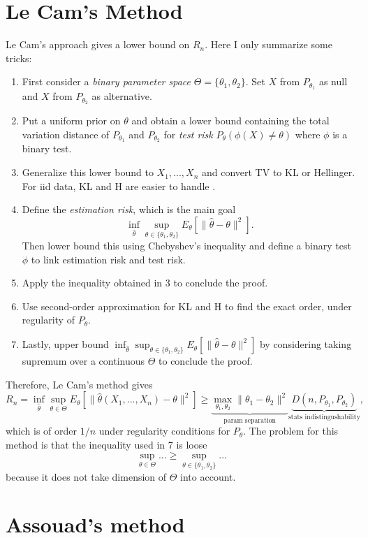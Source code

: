 \documentclass[11pt,twoside]{article}
\begin{document}
\section{Le Cam's Method}
Le Cam's approach gives a lower bound on $R_n$. Here I only summarize some tricks:
\begin{enumerate}
    \item First consider a \textit{binary parameter space} $\Theta = \{\theta_1, \theta_2\}$. Set $X$ from $P_{\theta_1}$ as null and $X$ from $P_{\theta_2}$ as alternative.
    \item Put a uniform prior on $\theta$ and obtain a lower bound containing the total variation distance of $P_{\theta_1}$ and $P_{\theta_2}$ for \textit{test risk} $P_{\theta}(\phi(X) \neq \theta)$ where $\phi$ is a binary test.
    \item Generalize this lower bound to $X_1,...,X_n$ and convert TV to KL or Hellinger. For iid data, KL and H are easier to handle .
    \item Define the \textit{estimation risk}, which is the main goal
    \[
    \inf_{\hat{\theta}}\sup_{\theta \in \{\theta_1, \theta_2\}}E_{\theta}[\|\hat{\theta}-\theta\|^2].
    \]
    Then lower bound this using Chebyshev's inequality and define a binary test $\phi$ to link estimation risk and test risk.
    \item Apply the inequality obtained in 3 to conclude the proof.
    \item Use second-order approximation for KL and H to find the exact order, under regularity of $P_{\theta}$.
    \item Lastly, upper bound $\inf_{\hat{\theta}}\sup_{\theta \in \{\theta_1, \theta_2\}}E_{\theta}[\|\hat{\theta}-\theta\|^2]$ by considering taking supremum over a continuous $\Theta$ to conclude the proof. 
\end{enumerate}
Therefore, Le Cam's method gives
\[
R_n = \inf_{\hat{\theta}}\sup_{\theta \in \Theta} E_{\theta}[\|\hat{\theta}(X_1,...,X_n)-\theta \|^2] \geq \underbrace{\max_{\theta_1,\theta_2}\|\theta_1-\theta_2\|^2}_{\text{param separation}} \underbrace{D(n, P_{\theta_1}, P_{\theta_2})}_{\text{stats indistingushability}},
\]
which is of order $1/n$ under regularity conditions for $P_{\theta}$. The problem for this method is that the inequality used in 7 is loose
\[
\sup_{\theta \in \Theta}...\geq \sup_{\theta \in \{\theta_1, \theta_2\}} ...
\]
because it does not take dimension of $\Theta$ into account.

\section{Assouad's method}
\end{document}
